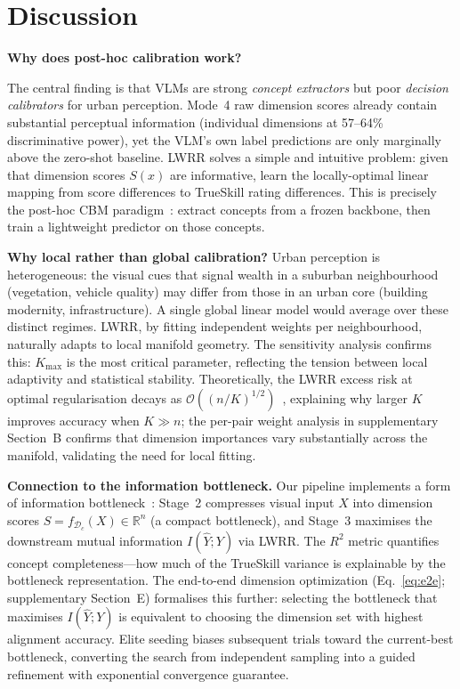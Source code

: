 \documentclass[runningheads]{llncs}
\begin{document}
\section{Discussion}
\label{sec:discussion}

\noindent\textbf{Why does post-hoc calibration work?}

The central finding is that VLMs are strong \emph{concept extractors} but poor \emph{decision calibrators} for urban perception.
Mode~4 raw dimension scores already contain substantial perceptual information (individual dimensions at 57--64\% discriminative power), yet the VLM's own label predictions are only marginally above the zero-shot baseline.
LWRR solves a simple and intuitive problem: given that dimension scores $S(x)$ are informative, learn the locally-optimal linear mapping from score differences to TrueSkill rating differences.
This is precisely the post-hoc CBM paradigm~\cite{yuksekgonul2023posthoc}: extract concepts from a frozen backbone, then train a lightweight predictor on those concepts.

\smallskip\noindent\textbf{Why local rather than global calibration?}
Urban perception is heterogeneous: the visual cues that signal wealth in a suburban neighbourhood (vegetation, vehicle quality) may differ from those in an urban core (building modernity, infrastructure).
A single global linear model would average over these distinct regimes.
LWRR, by fitting independent weights per neighbourhood, naturally adapts to local manifold geometry.
The sensitivity analysis confirms this: $K_{\max}$ is the most critical parameter, reflecting the tension between local adaptivity and statistical stability.
Theoretically, the LWRR excess risk at optimal regularisation decays as $\mathcal{O}((n/K)^{1/2})$~\cite{caponnetto2007optimal}, explaining why larger $K$ improves accuracy when $K \gg n$; the per-pair weight analysis in supplementary Section~B confirms that dimension importances vary substantially across the manifold, validating the need for local fitting.

\smallskip\noindent\textbf{Connection to the information bottleneck.}
Our pipeline implements a form of information bottleneck~\cite{tishby2000information}: Stage~2 compresses visual input $X$ into dimension scores $S{=}f_{\mathcal{D}_c}(X)\in\mathbb{R}^n$ (a compact bottleneck), and Stage~3 maximises the downstream mutual information $I(\hat{Y}; Y)$ via LWRR.
The $R^{2}$ metric quantifies concept completeness---how much of the TrueSkill variance is explainable by the bottleneck representation.
The end-to-end dimension optimization (Eq.~\eqref{eq:e2e}; supplementary Section~E) formalises this further: selecting the bottleneck that maximises $I(\hat{Y};Y)$ is equivalent to choosing the dimension set with highest alignment accuracy.
Elite seeding biases subsequent trials toward the current-best bottleneck, converting the search from independent sampling into a guided refinement with exponential convergence guarantee.
\end{document}
